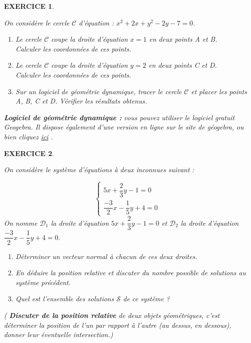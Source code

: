 \documentclass[a4paper]{article}   %
\renewcommand{\(}{\left(}
\renewcommand{\)}{\right)}
\newtheorem{EXO}{\large EXERCICE }
\newenvironment{EX}   { \setcounter{ques}{0} \begin{EXO} \hrulefill ~\vspace{0.3cm}

\normalfont}    {\end{EXO} \medskip}
\newcommand{\f}{\dfrac} 	%
\begin{document}
\begin{EX} On considère le cercle $\mathcal{C}$ d'équation : $x^2+2x+y^2-2y-7=0$. \begin{enumerate}
\item Le cercle $\mathcal{C}$ coupe la droite d'équation $x=1$ en deux points A et B. \\
Calculer les coordonnées de ces points.
\item Le cercle $\mathcal{C}$ coupe la droite d'équation $y=2$ en deux points C et D. \\
Calculer les coordonnées de ces points.
\item Sur un logiciel de géométrie dynamique, tracer le cercle $\mathcal{C}$ et placer les points A, B, C et D. Vérifier les résultats obtenus.
\end{enumerate}
{\small{ \textbf{Logiciel de géométrie dynamique :} vous pouvez utiliser le logiciel gratuit Geogebra. Il dispose également d'une version en ligne sur le site de géogebra, ou bien cliquez \href{https://www.geogebra.org/m/G8Fs6ybQ}{ici} .}}
\end{EX}

\begin{EX} 
On considère le système d'équations à deux inconnues suivant : 

$$ \left \{ \begin{array}{l}  	%
5x+\f{2}{3}y-1=0		 \\           			
\f{-3}{2}x-\f{1}{5}y+4=0		 
\end{array} \right. $$
On nomme $\mathcal{D}_1$ la droite d'équation $5x+\f{2}{3}y-1=0$ et $\mathcal{D}_2$ la droite d'équation $\f{-3}{2}x-\f{1}{5}y+4=0$. 
\begin{enumerate}
\item Déterminer un vecteur normal à chacun de ces deux droites.
\item En déduire la position relative et discuter du nombre possible de solutions au système précédent. 
\item Quel est l'ensemble des solutions $\mathcal{S}$ de ce système ?\end{enumerate}
{\small{( \textbf{Discuter de la position relative} de deux objets géométriques, c'est déterminer la position de l'un par rapport à l'autre (au dessus, en dessous), donner leur éventuelle intersection.)}}
\end{EX}
\end{document}

